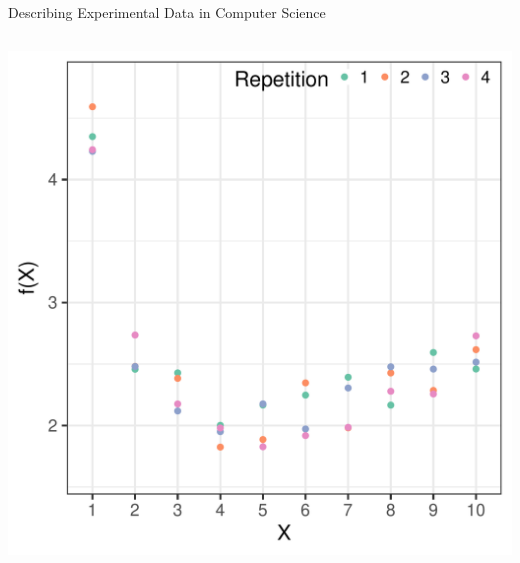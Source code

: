 \documentclass[10pt, compress, aspectratio=169, xcolor={table,usenames,dvipsnames}]{beamer}
\begin{document}
\begin{frame}[label={sec:org3bdbb34}]{Describing Experimental Data in Computer Science}
\begin{columns}
\begin{column}{0.5\columnwidth}
\begin{center}
\includegraphics[width=\columnwidth]{../../../img/intro-linear-regression-experimental-data.pdf}
\end{center}
\end{column}
\end{columns}
\end{frame}
\end{document}
